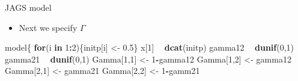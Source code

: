 \documentclass[
  ignorenonframetext,
]{beamer}
\newenvironment{Shaded}{\begin{snugshade}}{\end{snugshade}}
\newcommand{\ControlFlowTok}[1]{\textcolor[rgb]{0.13,0.29,0.53}{\textbf{#1}}}
\newcommand{\DecValTok}[1]{\textcolor[rgb]{0.00,0.00,0.81}{#1}}
\newcommand{\FloatTok}[1]{\textcolor[rgb]{0.00,0.00,0.81}{#1}}
\newcommand{\KeywordTok}[1]{\textcolor[rgb]{0.13,0.29,0.53}{\textbf{#1}}}
\newcommand{\NormalTok}[1]{#1}
\newcommand{\OperatorTok}[1]{\textcolor[rgb]{0.81,0.36,0.00}{\textbf{#1}}}
\newcommand{\StringTok}[1]{\textcolor[rgb]{0.31,0.60,0.02}{#1}}
\providecommand{\tightlist}{%
  \setlength{\itemsep}{0pt}\setlength{\parskip}{0pt}}
\begin{document}
\begin{frame}[fragile]{JAGS model}
\protect\hypertarget{jags-model-2}{}

\begin{itemize}
\tightlist
\item
  Next we specify \(\Gamma\)
\end{itemize}

\begin{Shaded}
\begin{Highlighting}[]
\NormalTok{model\{}
\ControlFlowTok{for}\NormalTok{(i }\ControlFlowTok{in} \DecValTok{1}\OperatorTok{:}\DecValTok{2}\NormalTok{)\{initp[i] <-}\StringTok{ }\FloatTok{0.5}\NormalTok{\}}
\NormalTok{x[}\DecValTok{1}\NormalTok{] }\OperatorTok{~}\StringTok{ }\KeywordTok{dcat}\NormalTok{(initp)}
\NormalTok{gamma12 }\OperatorTok{~}\StringTok{ }\KeywordTok{dunif}\NormalTok{(}\DecValTok{0}\NormalTok{,}\DecValTok{1}\NormalTok{)}
\NormalTok{gamma21 }\OperatorTok{~}\StringTok{ }\KeywordTok{dunif}\NormalTok{(}\DecValTok{0}\NormalTok{,}\DecValTok{1}\NormalTok{)}
\NormalTok{Gamma[}\DecValTok{1}\NormalTok{,}\DecValTok{1}\NormalTok{] <-}\StringTok{ }\DecValTok{1}\OperatorTok{-}\NormalTok{gamma12}
\NormalTok{Gamma[}\DecValTok{1}\NormalTok{,}\DecValTok{2}\NormalTok{] <-}\StringTok{ }\NormalTok{gamma12}
\NormalTok{Gamma[}\DecValTok{2}\NormalTok{,}\DecValTok{1}\NormalTok{] <-}\StringTok{ }\NormalTok{gamma21}
\NormalTok{Gamma[}\DecValTok{2}\NormalTok{,}\DecValTok{2}\NormalTok{] <-}\StringTok{ }\DecValTok{1}\OperatorTok{-}\NormalTok{gamm21}
\end{Highlighting}
\end{Shaded}

\end{frame}
\end{document}
